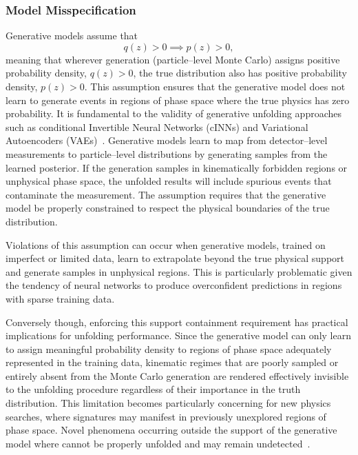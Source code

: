         \subsubsection{Model Misspecification}  
            Generative models assume that \[q(z) > 0 \implies p(z) > 0,\] meaning that wherever generation (particle--level Monte Carlo) assigns positive probability density, \(q(z) > 0\), the true distribution also has positive probability density, \(p(z) > 0\).
            This assumption ensures that the generative model does not learn to generate events in regions of phase space where the true physics has zero probability.
            It is fundamental to the validity of generative unfolding approaches such as conditional Invertible Neural Networks (cINNs) and Variational Autoencoders (VAEs)~\cite{Shmakov2025FullDiffusion}.
            Generative models learn to map from detector--level measurements to particle--level distributions by generating samples from the learned posterior.
            If the generation samples in kinematically forbidden regions or unphysical phase space, the unfolded results will include spurious events that contaminate the measurement.
            The assumption requires that the generative model be properly constrained to respect the physical boundaries of the true distribution.
            
            Violations of this assumption can occur when generative models, trained on imperfect or limited data, learn to extrapolate beyond the true physical support and generate samples in unphysical regions.
            This is particularly problematic given the tendency of neural networks to produce overconfident predictions in regions with sparse training data.
            
            Conversely though, enforcing this support containment requirement has practical implications for unfolding performance.
            Since the generative model can only learn to assign meaningful probability density to regions of phase space adequately represented in the training data, kinematic regimes that are poorly sampled or entirely absent from the Monte Carlo generation are rendered effectively invisible to the unfolding procedure regardless of their importance in the truth distribution.
            This limitation becomes particularly concerning for new physics searches, where signatures may manifest in previously unexplored regions of phase space.
            Novel phenomena occurring outside the support of the generative model where cannot be properly unfolded and may remain undetected~\cite{Amsler2008MonteTechniques}. 
            
